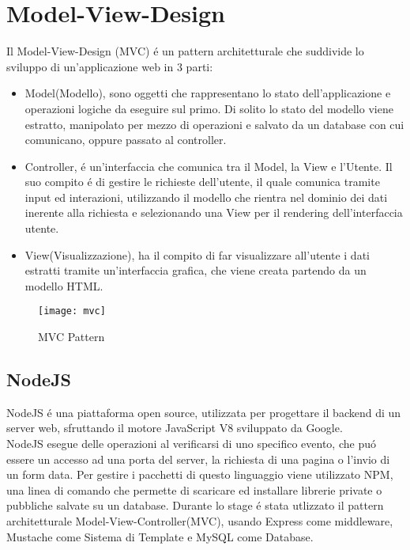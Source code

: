 \section{Model-View-Design}
Il Model-View-Design (MVC) \'e un pattern architetturale che suddivide lo sviluppo di un'applicazione web in 3 parti:
\begin{itemize}
\item Model(Modello), sono oggetti che rappresentano lo stato dell'applicazione e operazioni logiche da eseguire sul primo. Di solito
lo stato del modello viene estratto, manipolato per mezzo di operazioni e salvato da un database con cui comunicano,
oppure passato al controller.
\item Controller, \'e un'interfaccia che comunica tra il Model, la View e l'Utente. Il suo compito \'e di gestire le richieste dell'utente,
il quale comunica tramite input ed interazioni, utilizzando il modello che rientra nel dominio
dei dati inerente alla richiesta e selezionando una View per il rendering dell'interfaccia utente.
\item View(Visualizzazione), ha il compito di far visualizzare all'utente i dati estratti tramite un'interfaccia grafica, che viene creata
partendo da un modello HTML.\\[2\baselineskip]
\end{itemize}
\begin{figure}[H]
    \texttt{[image: mvc]}
    \caption{MVC Pattern}
\end{figure}
\fi

\subsection{NodeJS}
NodeJS \'e una piattaforma open source, utilizzata per progettare il backend di un server web, sfruttando
il motore JavaScript V8 sviluppato da Google.\\
NodeJS esegue delle operazioni al verificarsi di uno specifico evento, che pu\'o essere un accesso ad una porta
del server, la richiesta di una pagina o l'invio di un form data.
Per gestire i pacchetti di questo linguaggio viene utilizzato NPM\cite{NPM}, una linea di comando che permette
di scaricare ed installare librerie private o pubbliche salvate su un database.
Durante lo stage \'e stata utlizzato il pattern architetturale Model-View-Controller(MVC), usando Express
come middleware, Mustache come Sistema di Template e MySQL come Database.
\\[1\baselineskip]

